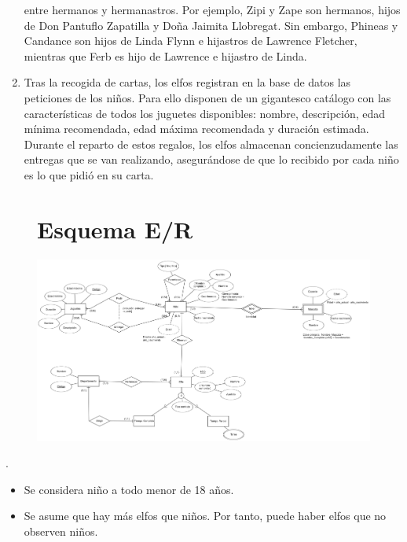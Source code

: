 \documentclass[a4paper, 11pt]{article}
\begin{document}
\begin{proy}
\begin{enumerate}
		entre hermanos y hermanastros. Por ejemplo, Zipi y Zape son hermanos, hijos de Don Pantuflo
		Zapatilla y Doña Jaimita Llobregat. Sin embargo, Phineas y Candance son hijos de Linda Flynn
		e hijastros de Lawrence Fletcher, mientras que Ferb es hijo de Lawrence e hijastro de Linda.
		\item Tras la recogida de cartas, los elfos registran en la base de datos las peticiones de los niños. Para
		ello disponen de un gigantesco catálogo con las características de todos los juguetes disponibles:
		nombre, descripción, edad mínima recomendada, edad máxima recomendada y duración
		estimada. Durante el reparto de estos regalos, los elfos almacenan concienzudamente las entregas
		que se van realizando, asegurándose de que lo recibido por cada niño es lo que pidió en su carta.
	\end{enumerate}
\end{proy}


\begin{figure}
\part*{Esquema E/R}	
	\centering
	\includegraphics[scale = 0.15, angle = 90]{Modelo/Arthur Christmas ER}
\end{figure}

\newpage 

\begin{hipad}.\\
	\begin{itemize}
		\item Se considera niño a todo menor de 18 años.
		\item Se asume que hay más elfos que niños. Por tanto, puede haber elfos que no observen niños. 
	\end{itemize}
\end{hipad}
	
\end{document}
